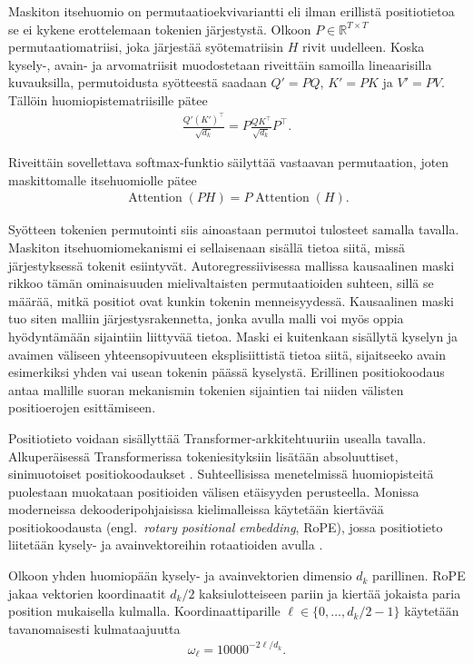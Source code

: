 Maskiton itsehuomio on permutaatioekvivariantti eli ilman erillistä
positiotietoa se ei kykene erottelemaan tokenien järjestystä. Olkoon
\(P \in \mathbb{R}^{T \times T}\) permutaatiomatriisi, joka järjestää
syötematriisin \(H\) rivit uudelleen. Koska kysely-, avain- ja
arvomatriisit muodostetaan riveittäin samoilla lineaarisilla
kuvauksilla, permutoidusta syötteestä saadaan
\(Q' = PQ\), \(K' = PK\) ja \(V' = PV\). Tällöin
huomiopistematriisille pätee
\begin{align*}
  \frac{Q'(K')^{\top}}{\sqrt{d_k}}
  =
  P
  \frac{QK^{\top}}{\sqrt{d_k}}
  P^{\top}.
\end{align*}

Riveittäin sovellettava softmax-funktio säilyttää vastaavan
permutaation, joten maskittomalle itsehuomiolle pätee
\begin{align*}
  \operatorname{Attention}(PH)
  =
  P\operatorname{Attention}(H).
\end{align*}

Syötteen tokenien permutointi siis ainoastaan permutoi tulosteet
samalla tavalla. Maskiton itsehuomiomekanismi ei sellaisenaan sisällä
tietoa siitä, missä järjestyksessä tokenit esiintyvät.
Autoregressiivisessa mallissa kausaalinen maski rikkoo tämän
ominaisuuden mielivaltaisten permutaatioiden suhteen, sillä se määrää,
mitkä positiot ovat kunkin tokenin menneisyydessä. Kausaalinen maski
tuo siten malliin järjestysrakennetta, jonka avulla malli voi myös
oppia hyödyntämään sijaintiin liittyvää tietoa. Maski ei kuitenkaan
sisällytä kyselyn ja avaimen väliseen yhteensopivuuteen eksplisiittistä
tietoa siitä, sijaitseeko avain esimerkiksi yhden vai usean tokenin
päässä kyselystä. Erillinen positiokoodaus antaa mallille suoran
mekanismin tokenien sijaintien tai niiden välisten positioerojen
esittämiseen.

Positiotieto voidaan sisällyttää Transformer-arkkitehtuuriin usealla
tavalla. Alkuperäisessä Transformerissa tokeniesityksiin lisätään
absoluuttiset, sinimuotoiset positiokoodaukset
\cite{vaswani2017attention}. Suhteellisissa menetelmissä
huomiopisteitä puolestaan muokataan positioiden välisen etäisyyden
perusteella. Monissa moderneissa dekooderipohjaisissa kielimalleissa
käytetään kiertävää positiokoodausta (engl.\ \emph{rotary positional
embedding}, RoPE), jossa positiotieto liitetään kysely- ja
avainvektoreihin rotaatioiden avulla \cite{su2024roformer}.

Olkoon yhden huomiopään kysely- ja avainvektorien dimensio \(d_k\)
parillinen. RoPE jakaa vektorien koordinaatit \(d_k/2\)
kaksiulotteiseen pariin ja kiertää jokaista paria position mukaisella
kulmalla. Koordinaattiparille
\(\ell \in \{0,\dots,d_k/2-1\}\) käytetään tavanomaisesti kulmataajuutta
\begin{align*}
  \omega_{\ell}
  =
  10000^{-2\ell/d_k}.
\end{align*}

